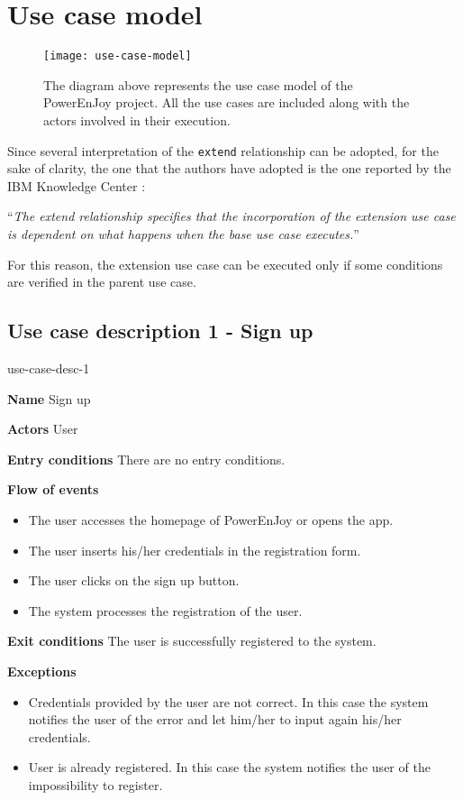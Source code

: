 \section{Use case model}

\begin{figure}[H]
	\centering
	\texttt{[image: use-case-model]}
	\caption[Use case model]{The diagram above represents the use case model of the PowerEnJoy project. All the use cases are included along with the actors involved in their execution.}
	\label{fig:use-case-model}
\end{figure}

Since several interpretation of the \texttt{extend} relationship can be adopted, for the sake of clarity, the one that the authors have adopted is the one reported by the IBM Knowledge Center \cite{extend}:

\enquote{\textit{The extend relationship specifies that the incorporation of the extension use case is dependent on what happens when the base use case executes.}}

For this reason, the extension use case can be executed only if some conditions are verified in the parent use case.

\subsection{Use case description 1 - Sign up}
\begin{labeling}{use-case-desc-1}
	\item[\textbf{Name}] Sign up
	\item[\textbf{Actors}] User
	\item[\textbf{Entry conditions}] There are no entry conditions.
	\item[\textbf{Flow of events}]
		\begin{itemize}
			\item[]
			\item The user accesses the homepage of PowerEnJoy or opens the app.
			\item The user inserts his/her credentials in the registration form.
			\item The user clicks on the sign up button.
			\item The system processes the registration of the user.
		\end{itemize}
	\item[\textbf{Exit conditions}] The user is successfully registered to the system.
	\item[\textbf{Exceptions}]
		\begin{itemize}
			\item[]
			\item Credentials provided by the user are not correct. In this case the system notifies the user of the error and let him/her to input again his/her credentials. 
			\item User is already registered. In this case the system notifies the user of the impossibility to register.
		\end{itemize}
\end{labeling}

